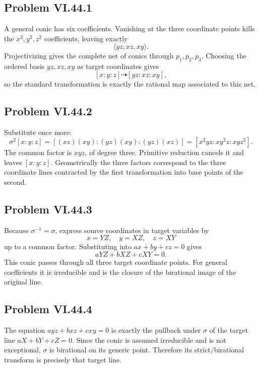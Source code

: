 \subsection*{Problem VI.44.1}
\begin{solution}
A general conic has six coefficients.  Vanishing at the three coordinate points kills the \(x^2,y^2,z^2\) coefficients, leaving exactly
\[
\langle yz,xz,xy\rangle.
\]
Projectivizing gives the complete net of conics through \(p_1,p_2,p_3\).  Choosing the ordered basis \(yz,xz,xy\) as target coordinates gives
\[
[x:y:z]\dashrightarrow[yz:xz:xy],
\]
so the standard transformation is exactly the rational map associated to this net.
\end{solution}

\subsection*{Problem VI.44.2}
\begin{solution}
Substitute once more:
\[
\sigma^2[x:y:z]
=[(xz)(xy):(yz)(xy):(yz)(xz)]
=[x^2yz:xy^2z:xyz^2].
\]
The common factor is \(xyz\), of degree three.  Primitive reduction cancels it and leaves \([x:y:z]\).  Geometrically the three factors correspond to the three coordinate lines contracted by the first transformation into base points of the second.
\end{solution}

\subsection*{Problem VI.44.3}
\begin{solution}
Because \(\sigma^{-1}=\sigma\), express source coordinates in target variables by
\[
x=YZ,\quad y=XZ,\quad z=XY
\]
up to a common factor.  Substituting into \(ax+by+cz=0\) gives
\[
aYZ+bXZ+cXY=0.
\]
This conic passes through all three target coordinate points.  For general coefficients it is irreducible and is the closure of the birational image of the original line.
\end{solution}

\subsection*{Problem VI.44.4}
\begin{solution}
The equation \(ayz+bxz+cxy=0\) is exactly the pullback under \(\sigma\) of the target line \(aX+bY+cZ=0\).  Since the conic is assumed irreducible and is not exceptional, \(\sigma\) is birational on its generic point.  Therefore its strict/birational transform is precisely that target line.
\end{solution}

